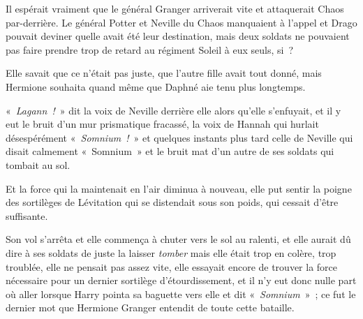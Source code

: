 Il espérait vraiment que le général Granger arriverait vite et attaquerait Chaos par-derrière. Le général Potter et Neville du Chaos manquaient à l'appel et Drago pouvait deviner quelle avait été leur destination, mais deux soldats ne pouvaient pas faire prendre trop de retard au régiment Soleil à eux seuls, si~?

\later

Elle savait que ce n'était pas juste, que l'autre fille avait tout donné, mais Hermione souhaita quand même que Daphné aie tenu plus longtemps.

«~\emph{Lagann~!}~» dit la voix de Neville derrière elle alors qu'elle s'enfuyait, et il y eut le bruit d'un mur prismatique fracassé, la voix de Hannah qui hurlait désespérément «~\emph{Somnium~!}~» et quelques instants plus tard celle de Neville qui disait calmement «~Somnium~» et le bruit mat d'un autre de ses soldats qui tombait au sol.

Et la force qui la maintenait en l'air diminua à nouveau, elle put sentir la poigne des sortilèges de Lévitation qui se distendait sous son poids, qui cessait d'être suffisante.

Son vol s'arrêta et elle commença à chuter vers le sol au ralenti, et elle aurait dû dire à ses soldats de juste la laisser \emph{tomber} mais elle était trop en colère, trop troublée, elle ne pensait pas assez vite, elle essayait encore de trouver la force nécessaire pour un dernier sortilège d'étourdissement, et il n'y eut donc nulle part où aller lorsque Harry pointa sa baguette vers elle et dit «~\emph{Somnium}~»~; ce fut le dernier mot que Hermione Granger entendit de toute cette bataille.
